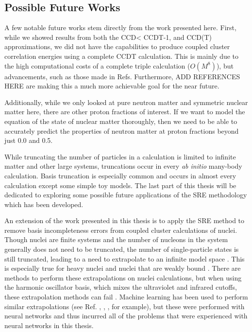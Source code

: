 
\subsection*{Possible Future Works}
A few notable future works stem directly from the work presented here. First, while we showed results from both the CCD< CCDT-1, and CCD(T) approximations, we did not have the capabilities to produce coupled cluster correlation energies using a complete CCDT calculation. This is mainly due to the high computational costs of a complete triple calculation ($O(M^8)$), but advancements, such as those made in Refs. Furthermore, ADD REFERENCES HERE are making this a much more achievable goal for the near future.

Additionally, while we only looked at pure neutron matter and symmetric nuclear matter here, there are other proton fractions of interest. If we want to model the equation of the state of nuclear matter thoroughly, then we need to be able to accurately predict the properties of neutron matter at proton fractions beyond just 0.0 and 0.5.

While truncating the number of particles in a calculation is limited to infinite matter and other large systems, truncations occur in every \textit{ab initio} many-body calculation. Basis truncation is especially common and occurs in almost every calculation except some simple toy models. The last part of this thesis will be dedicated to exploring some possible future applications of the SRE methodology which has been developed.

An extension of the work presented in this thesis is to apply the SRE method to remove basis incompleteness errors from coupled cluster calculations of nuclei. Though nuclei are finite systems and the number of nucleons in the system generally does not need to be truncated, the number of single-particle states is still truncated, leading to a need to extrapolate to an infinite model space \cite{Ref6}. This is especially true for heavy nuclei and nuclei that are weakly bound \cite{Ref6}. There are methods to perform these extrapolations on nuclei calculations, but when using the harmonic oscillator basis, which mixes the ultraviolet and infrared cutoffs, these extrapolation methods can fail \cite{Ref6}. Machine learning has been used to perform similar extrapolations (see Ref. \cite{Ref6}, \cite{Ref22}, \cite{Ref23}, for example), but these were performed with neural networks and thus incurred all of the problems that were experienced with neural networks in this thesis.

